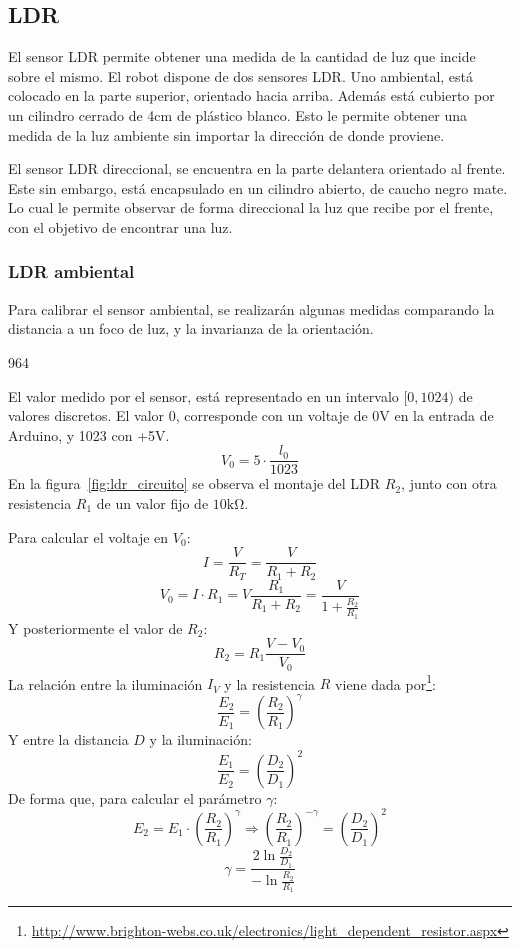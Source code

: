 \documentclass[10pt,a4paper,hidelinks]{article}
\begin{document}
\begin{multicols}{2}
\subsection{LDR}

El sensor LDR permite obtener una medida de la cantidad de luz que incide sobre
el mismo. El robot dispone de dos sensores LDR. Uno ambiental, está colocado en
la parte superior, orientado hacia arriba. Además está cubierto por un cilindro
cerrado de 4cm de plástico blanco. Esto le permite obtener una medida de la luz
ambiente sin importar la dirección de donde proviene.

El sensor LDR direccional, se encuentra en la parte delantera orientado al 
frente. Este sin embargo, está encapsulado en un cilindro abierto, de caucho 
negro mate. Lo cual le permite observar de forma direccional la luz que recibe 
por el frente, con el objetivo de encontrar una luz.

\subsubsection{LDR ambiental}

Para calibrar el sensor ambiental, se realizarán algunas medidas comparando la 
distancia a un foco de luz, y la invarianza de la orientación.

964

El valor medido por el sensor, está representado en un intervalo $[0, 1024)$ de 
valores discretos. El valor 0, corresponde con un voltaje de 0V en la entrada de 
Arduino, y 1023 con +5V.
$$ V_0 = 5 \cdot \frac{l_0}{1023} $$
En la figura~\ref{fig:ldr_circuito} se observa el montaje del LDR $R_2$, junto 
con otra resistencia $R_1$ de un valor fijo de $10\si{\kohm}$.

\begin{center}
\end{center}

Para calcular el voltaje en $V_0$:
$$ I = \frac{V}{R_T} = \frac{V}{R_1 + R_2} $$
$$ V_{0} = I \cdot R_1 = V \frac{R_1}{R_1+R_2} = \frac{V}{1+\frac{R_2}{R_1}}$$
Y posteriormente el valor de $R_2$:
$$ R_{2} = R_1 \frac{V-V_0}{V_0}$$
La relación entre la iluminación $I_V$ y la resistencia $R$ viene dada 
por\footnote{\url{http://www.brighton-webs.co.uk/electronics/light\_dependent\_resistor.aspx}}:
$$ \frac{E_2}{E_1} = \left(\frac{R_2}{R_1}\right)^\gamma$$
Y entre la distancia $D$ y la iluminación:
$$ \frac{E_1}{E_2} = \left(\frac{D_2}{D_1}\right)^2$$
De forma que, para calcular el parámetro $\gamma$:
$$ E_2 = E_1 \cdot \left( \frac{R_2}{R_1} \right) ^\gamma \Rightarrow 
\left(\frac{R_2}{R_1} \right)^{-\gamma} = \left(\frac{D_2}{D_1}\right)^2$$
$$ \gamma = \frac{2 \ln \frac{D_2}{D_1} }{-\ln\frac{R_2}{R_1}} $$


\end{multicols}
\end{document}
